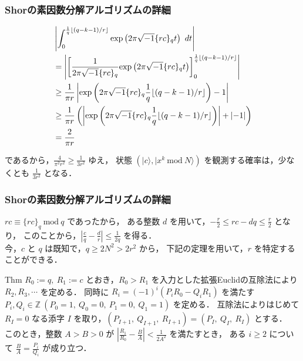 \documentclass[dvipdfmx,12pt]{beamer}
\begin{document}
\begin{frame}

\frametitle{Shorの素因数分解アルゴリズムの詳細}

\begin{align*}
    \displaystyle & \left| \int_{0}^{\frac{1}{q} \lfloor (q - k - 1)/r \rfloor} \mathrm{exp} \left( 2 \pi \sqrt{-1} \{ rc \}_q t \right) \ dt \right| \\
    \displaystyle & = \left| \left[ \frac{1}{2 \pi \sqrt{-1} \{ rc \}_q} \mathrm{exp} \left( 2 \pi \sqrt{-1} \{ rc \}_q t \right) \right]_0^{\frac{1}{q} \lfloor (q - k - 1)/r \rfloor} \right| \\
    \displaystyle & \geq \frac{1}{\pi r} \left| \mathrm{exp} \left( 2 \pi \sqrt{-1} \{ rc \}_q \frac{1}{q} \lfloor (q - k - 1)/r \rfloor \right) - 1 \right| \\
    \displaystyle & \geq \frac{1}{\pi r} \left( \left| \mathrm{exp} \left( 2 \pi \sqrt{-1} \{ rc \}_q \frac{1}{q} \lfloor (q - k - 1)/r \rfloor \right) \right| + \left| - 1 \right| \right) \\
    \displaystyle & = \frac{2}{\pi r}
\end{align*}

であるから，$ \frac{4}{\pi^2 r^2} \geq \frac{1}{3 r^2} $ ゆえ，
状態 $ ( | c \rangle, | x^k \ \mathrm{mod} \ N \rangle ) $ を観測する確率は，少なくとも $ \frac{1}{3 r^2} $ となる．
    
\end{frame}


\begin{frame}

\frametitle{Shorの素因数分解アルゴリズムの詳細}
    
$ rc \equiv \{ rc \}_q \ \mathrm{mod} \ q $ であったから，
ある整数 $d$ を用いて，$ - \frac{r}{2} \leq rc - dq \leq \frac{r}{2} $ となり，
このことから，$ \left| \frac{c}{q} - \frac{d}{r} \right| \leq \frac{1}{2q} $ を得る． \\
今，$ c $ と $q$ は既知で，$ q \geq 2 N^2 > 2 r^2 $ から，
下記の定理\cite{縫田}を用いて，$r$ を特定することができる．

\vspace{10pt}

\begin{itembox}[l]{Thm}
    $ R_0 := q, \ R_1 := c $ とおき，$ R_0 > R_1 $ を入力とした拡張Euclidの互除法により $ R_2, R_3, \cdots $ を定める．
    同時に $ R_i = (-1)^i (P_i R_0 - Q_i R_1) $ を満たす $ P_i, Q_i \in \mathbb{Z} \ (P_0 = 1, \ Q_0 = 0, \ P_1 = 0, \ Q_1 = 1) $ を定める．
    互除法によりはじめて $ R_I = 0 $ なる添字 $I$ を取り，$ (P_{I + 1}, \ Q_{I + 1}, \ R_{I + 1}) = (P_{I}, \ Q_{I}, \ R_{I}) $ とする． \\
    このとき，整数 $ A > B > 0 $ が $ \left| \frac{R_1}{R_0} - \frac{B}{A} \right| < \frac{1}{2 A^2} $ を満たすとき，
    ある $ i \geq 2 $ について $ \frac{B}{A} = \frac{P_i}{Q_i} $ が成り立つ．
\end{itembox} 

\end{frame}
\end{document}

